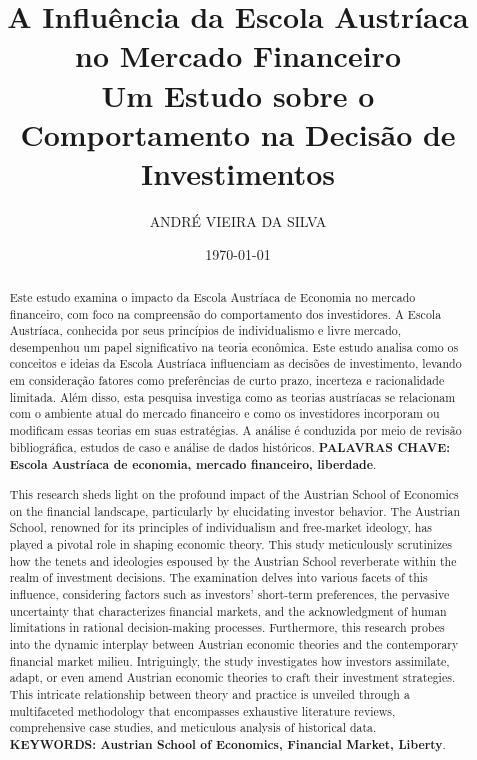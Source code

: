 \documentclass[a4paper,12pt]{article}
\title{ \textbf{\large A Influência da Escola Austríaca no Mercado Financeiro} \\
\large Um Estudo sobre o Comportamento na Decisão de Investimentos}
\author{ANDRÉ VIEIRA DA SILVA}
\date{\today}
\begin{document}
\maketitle


\begin{abstract}
Este estudo examina o impacto da Escola Austríaca de Economia no mercado financeiro,
com foco na compreensão do comportamento dos investidores. A Escola Austríaca, 
conhecida por seus princípios de individualismo e livre mercado, desempenhou um papel 
significativo na teoria econômica. Este estudo analisa como os conceitos e ideias da 
Escola Austríaca influenciam as decisões de investimento, levando em consideração 
fatores como preferências de curto prazo, incerteza e racionalidade limitada. 
Além disso, esta pesquisa investiga como as teorias austríacas se relacionam com o 
ambiente atual do mercado financeiro e como os investidores incorporam ou modificam 
essas teorias em suas estratégias. A análise é conduzida por meio de revisão bibliográfica, 
estudos de caso e análise de dados históricos. 
\textbf{PALAVRAS CHAVE: Escola Austr\'iaca de economia, mercado financeiro, liberdade}.
\end{abstract}

\begin{abstract}
This research sheds light on the profound impact of the Austrian School of Economics 
on the financial landscape, particularly by elucidating investor behavior. The Austrian School, 
renowned for its principles of individualism and free-market ideology, has played a pivotal 
role in shaping economic theory. This study meticulously scrutinizes how the tenets and ideologies 
espoused by the Austrian School reverberate within the realm of investment decisions.
The examination delves into various facets of this influence, considering factors such as 
investors' short-term preferences, the pervasive uncertainty that characterizes financial 
markets, and the acknowledgment of human limitations in rational decision-making processes. 
Furthermore, this research probes into the dynamic interplay between Austrian economic theories 
and the contemporary financial market milieu. Intriguingly, the study investigates how investors 
assimilate, adapt, or even amend Austrian economic theories to craft their investment strategies. 
This intricate relationship between theory and practice is unveiled through a multifaceted 
methodology that encompasses exhaustive literature reviews, comprehensive case studies, 
and meticulous analysis of historical data.
\textbf{KEYWORDS: Austrian School of Economics, Financial Market, Liberty}.
\end{abstract}
\end{document}
